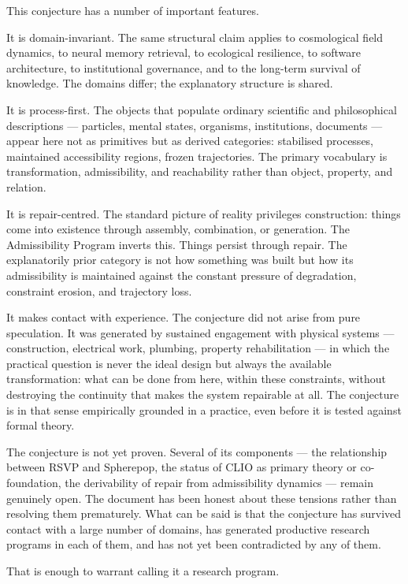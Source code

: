 \documentclass[12pt, twoside]{article}
\begin{document}
This conjecture has a number of important features.

It is domain-invariant. The same structural claim applies to cosmological
field dynamics, to neural memory retrieval, to ecological resilience, to
software architecture, to institutional governance, and to the long-term
survival of knowledge. The domains differ; the explanatory structure is
shared.

It is process-first. The objects that populate ordinary scientific and
philosophical descriptions — particles, mental states, organisms, institutions,
documents — appear here not as primitives but as derived categories:
stabilised processes, maintained accessibility regions, frozen trajectories.
The primary vocabulary is transformation, admissibility, and reachability
rather than object, property, and relation.

It is repair-centred. The standard picture of reality privileges construction:
things come into existence through assembly, combination, or generation. The
Admissibility Program inverts this. Things persist through repair. The
explanatorily prior category is not how something was built but how its
admissibility is maintained against the constant pressure of degradation,
constraint erosion, and trajectory loss.

It makes contact with experience. The conjecture did not arise from pure
speculation. It was generated by sustained engagement with physical systems
— construction, electrical work, plumbing, property rehabilitation — in which
the practical question is never the ideal design but always the available
transformation: what can be done from here, within these constraints, without
destroying the continuity that makes the system repairable at all. The
conjecture is in that sense empirically grounded in a practice, even before
it is tested against formal theory.

The conjecture is not yet proven. Several of its components — the
relationship between RSVP and Spherepop, the status of CLIO as primary theory
or co-foundation, the derivability of repair from admissibility dynamics —
remain genuinely open. The document has been honest about these tensions
rather than resolving them prematurely. What can be said is that the
conjecture has survived contact with a large number of domains, has generated
productive research programs in each of them, and has not yet been
contradicted by any of them.

That is enough to warrant calling it a research program.
\end{document}
